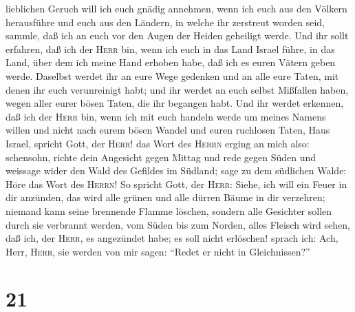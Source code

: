 lieblichen Geruch will ich euch gnädig annehmen, wenn ich euch aus den
Völkern herausführe und euch aus den Ländern, in welche ihr zerstreut
worden seid, sammle, daß ich an euch vor den Augen der Heiden geheiligt
werde.  Und ihr sollt erfahren, daß ich der \textsc{Herr}
bin, wenn ich euch in das Land Israel führe, in das Land, über dem ich
meine Hand erhoben habe, daß ich es euren Vätern geben werde.
 Daselbst werdet ihr an eure Wege gedenken und an alle
eure Taten, mit denen ihr euch verunreinigt habt; und ihr werdet an euch
selbst Mißfallen haben, wegen aller eurer bösen Taten, die ihr begangen
habt.  Und ihr werdet erkennen, daß ich der \textsc{Herr}
bin, wenn ich mit euch handeln werde um meines Namens willen und nicht
nach eurem bösen Wandel und euren ruchlosen Taten, Haus Israel, spricht
Gott, der \textsc{Herr}!  das Wort des \textsc{Herrn}
erging an mich also:  schensohn, richte dein Angesicht
gegen Mittag und rede gegen Süden und weissage wider den Wald des
Gefildes im Südland;  sage zu dem südlichen Walde: Höre
das Wort des \textsc{Herrn}! So spricht Gott, der \textsc{Herr}: Siehe,
ich will ein Feuer in dir anzünden, das wird alle grünen und alle dürren
Bäume in dir verzehren; niemand kann seine brennende Flamme löschen,
sondern alle Gesichter sollen durch sie verbrannt werden, vom Süden bis
zum Norden,  alles Fleisch wird sehen, daß ich, der
\textsc{Herr}, es angezündet habe; es soll nicht erlöschen!
 sprach ich: Ach, Herr, \textsc{Herr}, sie werden von mir
sagen: ``Redet er nicht in Gleichnissen?''

\hypertarget{section-20}{%
\section{21}\label{section-20}}

